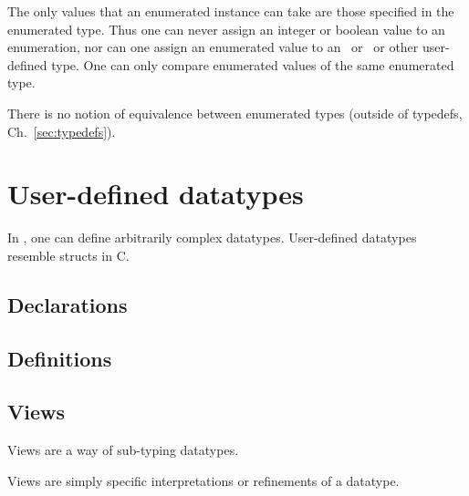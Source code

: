 The only values that an enumerated instance can take are 
those specified in the enumerated type.  
Thus one can never assign an integer or boolean value to an enumeration, 
nor can one assign an enumerated value to an \int\ or \bool\ or
other user-defined type.  
One can only compare enumerated values of the same enumerated type.  

There is no notion of equivalence between enumerated types 
(outside of typedefs, Ch.~\ref{sec:typedefs}).  

\section{User-defined datatypes}
\label{sec:datatype:userdef}

In \artxx, one can define arbitrarily complex datatypes.  
User-defined datatypes resemble structs in C.  

\subsection{Declarations}
\label{sec:datatype:userdef:declaration}

\subsection{Definitions}
\label{sec:datatype:userdef:definition}

\subsection{Views}
\label{sec:datatype:userdef:views}

Views are a way of sub-typing datatypes.  

Views are simply specific interpretations or refinements of a datatype.  




